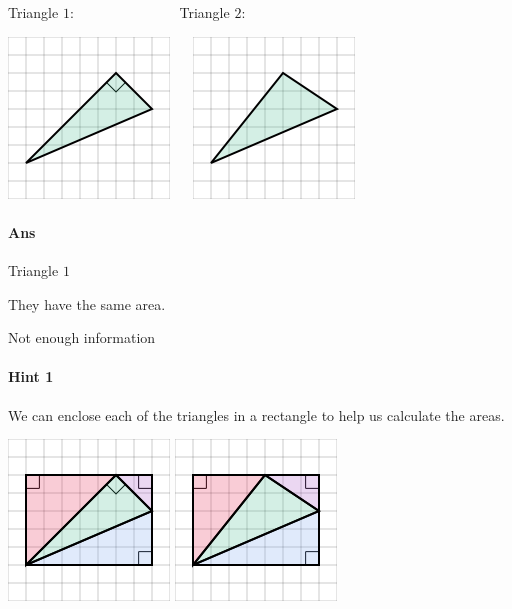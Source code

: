 \documentclass[twocolumn,10pt]{article}
\def\shrinkfactor{0.55}
\begin{document}
Triangle $1$:  $\qquad\qquad \qquad ~~~~$ Triangle $2$:  

\includegraphics[scale=\shrinkfactor]{figures/46841150979f49ca89a48dfd0ca0e6f1e8e7832d.png} $\quad$ 
\includegraphics[scale=\shrinkfactor]{figures/8b6a988158cd3db95c5b26bd13390a3c70a2c055.png}


\paragraph{Ans} 

Triangle $1$


 They have the same area.

Not enough information



\paragraph{Hint 1}We can enclose each of the triangles in a rectangle to help us calculate the areas.  

\includegraphics[scale=\shrinkfactor]{figures/007ce6e3f8950260d7c441f0203fe8adf5d08f91.png} 
\includegraphics[scale=\shrinkfactor]{figures/8bbfecfe4fe8d5414e8abf67cdb22cdeec58672e.png}
\end{document}
